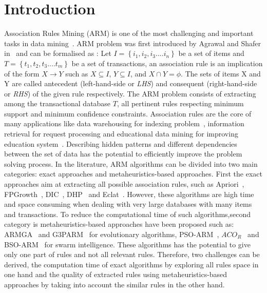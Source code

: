\documentclass[preprint,12pt]{elsarticle}
\begin{document}
\section{Introduction}
 Association Rules Mining (ARM) is one of the most challenging and important tasks in data mining~\cite{1}. 
 ARM problem was first introduced by Agrawal and Shafer in~\cite{2} and can be formalised as :
 Let $I=\left\{i_{1},i_{2},i_{3}....i_{n}\right\}$ be a set of items and $T =\left\{t_{1},t_{2},t_{3}....t_{m}\right\}$ be a set of transactions, 
 an association rule is an implication of the form 
 $X \rightarrow Y$ such as $X \subseteq  I$, $Y \subseteq I$, and $X \cap Y = \phi$. 
The sets of items X and Y are called antecedent (left-hand-side or \textit{LHS}) and consequent (right-hand-side or \textit{RHS}) of the given rule 
respectively. The ARM problem consists of extracting among the transactional database $T$, 
all pertinent rules respecting minimum support and minimum confidence constraints. Association rules are the core of many applications like data warehousing for indexing problem~\cite{3},
information retrieval for request processing and educational data mining for improving education system~\cite{4}. Describing hidden patterns 
and different dependencies between the set of data has the potential to efficiently improve
the problem solving process. In the literature, ARM algorithms can be divided into two main categories: exact approaches and 
metaheuristics-based approaches. First the exact approaches aim at extracting all possible association rules, such as Apriori~\cite{5}, FPGrowth~\cite{6}, DIC~\cite{7}, DHP~\cite{8} and Eclat~\cite{9}. However, these algorithms are high time and space consuming when dealing with very large databases with many items and transactions. 
To reduce the computational time of such algorithms,second category is metaheuristics-based approaches have been proposed such as: ARMGA~\cite{10} and G3PARM~\cite{11} for evolutionary algorithms, PSO-ARM~\cite{12}, $ACO_R$~\cite{13} and BSO-ARM~\cite{14} 
for swarm intelligence. These algorithms has the potential to give only one part of rules and not all relevant rules. Therefore, two challenges can be derived, the computation time of exact algorithms by exploring all rules space in one hand and the quality of extracted rules using metaheuristics-based approaches by taking into account the similar rules in the other hand. \\
\end{document}
